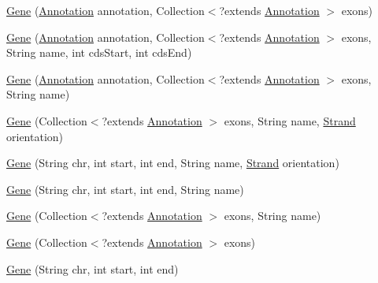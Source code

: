 \begin{DoxyCompactItemize}
\item 
\hyperlink{classumms_1_1core_1_1annotation_1_1_gene_a66237ccc34685706c0ce796857136739}{Gene} (\hyperlink{interfaceumms_1_1core_1_1annotation_1_1_annotation}{Annotation} annotation, Collection$<$?extends \hyperlink{interfaceumms_1_1core_1_1annotation_1_1_annotation}{Annotation} $>$ exons)
\item 
\hyperlink{classumms_1_1core_1_1annotation_1_1_gene_a56183cd9a73adbd2593dee9967be848b}{Gene} (\hyperlink{interfaceumms_1_1core_1_1annotation_1_1_annotation}{Annotation} annotation, Collection$<$?extends \hyperlink{interfaceumms_1_1core_1_1annotation_1_1_annotation}{Annotation} $>$ exons, String name, int cds\+Start, int cds\+End)
\item 
\hyperlink{classumms_1_1core_1_1annotation_1_1_gene_a45094334f41cc5edd81ec65e8d8057e6}{Gene} (\hyperlink{interfaceumms_1_1core_1_1annotation_1_1_annotation}{Annotation} annotation, Collection$<$?extends \hyperlink{interfaceumms_1_1core_1_1annotation_1_1_annotation}{Annotation} $>$ exons, String name)
\item 
\hyperlink{classumms_1_1core_1_1annotation_1_1_gene_a546e8e49de5cbcc51792570a18c28042}{Gene} (Collection$<$?extends \hyperlink{interfaceumms_1_1core_1_1annotation_1_1_annotation}{Annotation} $>$ exons, String name, \hyperlink{enumumms_1_1core_1_1annotation_1_1_annotation_1_1_strand}{Strand} orientation)
\item 
\hyperlink{classumms_1_1core_1_1annotation_1_1_gene_a703c2e1576e3292947d8a32ac4116825}{Gene} (String chr, int start, int end, String name, \hyperlink{enumumms_1_1core_1_1annotation_1_1_annotation_1_1_strand}{Strand} orientation)
\item 
\hyperlink{classumms_1_1core_1_1annotation_1_1_gene_a094d9759d7bfdb96870a9eda3d7c6cbf}{Gene} (String chr, int start, int end, String name)
\item 
\hyperlink{classumms_1_1core_1_1annotation_1_1_gene_a83c336a436173c303533e6aac5c35b44}{Gene} (Collection$<$?extends \hyperlink{interfaceumms_1_1core_1_1annotation_1_1_annotation}{Annotation} $>$ exons, String name)
\item 
\hyperlink{classumms_1_1core_1_1annotation_1_1_gene_ad1ea391098c404b161e69af3b4eb1564}{Gene} (Collection$<$?extends \hyperlink{interfaceumms_1_1core_1_1annotation_1_1_annotation}{Annotation} $>$ exons)
\item 
\hyperlink{classumms_1_1core_1_1annotation_1_1_gene_a477ff66b4316fd18f7b810022f74373e}{Gene} (String chr, int start, int end)
\item 

\end{DoxyCompactItemize}
